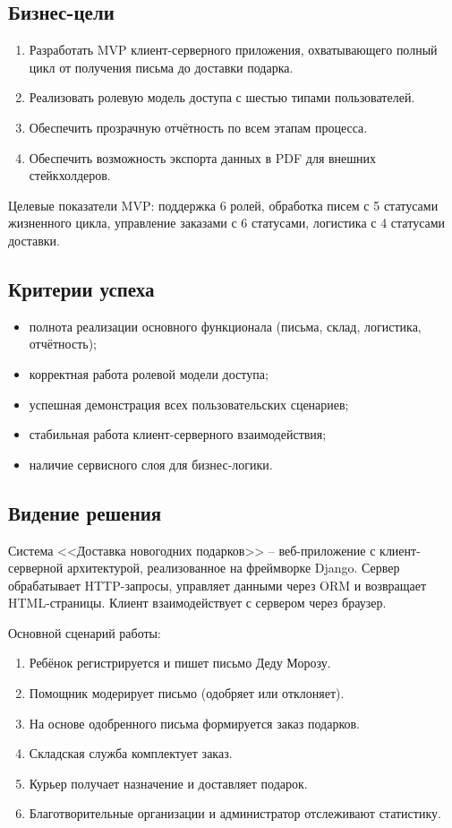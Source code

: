 \documentclass[14pt,a4paper]{extarticle}
\begin{document}
\subsection{Бизнес-цели}

\begin{enumerate}
    \item Разработать MVP клиент-серверного приложения, охватывающего полный цикл от получения письма до доставки подарка.
    \item Реализовать ролевую модель доступа с шестью типами пользователей.
    \item Обеспечить прозрачную отчётность по всем этапам процесса.
    \item Обеспечить возможность экспорта данных в PDF для внешних стейкхолдеров.
\end{enumerate}

Целевые показатели MVP: поддержка 6 ролей, обработка писем с 5 статусами жизненного цикла, управление заказами с 6 статусами, логистика с 4 статусами доставки.

\subsection{Критерии успеха}

\begin{itemize}
    \item полнота реализации основного функционала (письма, склад, логистика, отчётность);
    \item корректная работа ролевой модели доступа;
    \item успешная демонстрация всех пользовательских сценариев;
    \item стабильная работа клиент-серверного взаимодействия;
    \item наличие сервисного слоя для бизнес-логики.
\end{itemize}

\subsection{Видение решения}

Система <<Доставка новогодних подарков>> -- веб-приложение с клиент-серверной архитектурой, реализованное на фреймворке Django. Сервер обрабатывает HTTP-запросы, управляет данными через ORM и возвращает HTML-страницы. Клиент взаимодействует с сервером через браузер.

Основной сценарий работы:
\begin{enumerate}
    \item Ребёнок регистрируется и пишет письмо Деду Морозу.
    \item Помощник модерирует письмо (одобряет или отклоняет).
    \item На основе одобренного письма формируется заказ подарков.
    \item Складская служба комплектует заказ.
    \item Курьер получает назначение и доставляет подарок.
    \item Благотворительные организации и администратор отслеживают статистику.
\end{enumerate}
\end{document}
